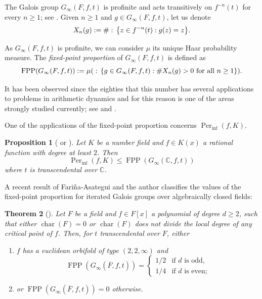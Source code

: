 \documentclass{amsart}
\def\set#1{{\def\st{\;:\;}\left\{#1\right\}}}
\def\CC{\mathbb C}
\DeclareMathOperator{\FPP}{FPP}
\DeclareMathOperator{\Per}{Per}
\DeclareMathOperator{\car}{char}
\DeclareMathOperator{\st}{st}
\newtheorem{proposition}{Proposition}[section]
\newtheorem{theorem}[proposition]{Theorem}
\theoremstyle{definition}
\begin{document}
The Galois group $G_\infty(F,f,t)$ is profinite and acts transitively on $f^{-n}(t)$ for every $n \geq 1$; see \cite{Jones2014, Radi2025FPP}. Given $n \geq 1$ and $g \in G_\infty(F,f,t)$, let us denote $$X_n(g) := \# \set{z \in f^{-n}(t): g(z) = z}.$$

As $G_\infty(F,f,t)$ is profinite, we can consider $\mu$ its unique Haar probability measure. The \textit{fixed-point proportion} of $G_\infty(F,f,t)$ is defined as $$\FPP(G_\infty(F,f,t)) := \mu(\set{g \in G_\infty(F,f,t) : \# X_n(g) > 0 \text{ for all $n \geq 1$}}).$$

It has been observed since the eighties that this number has several applications to problems in arithmetic dynamics \cite{JonesManes2012, ManesThompson2019, Odoni1980, Odoni1985} and for this reason is one of the areas strongly studied currently; see \cite{Adams2025, AdamsHyde2025, Fariña2026, Tucker2013ABC, Jones2008, Jones2012} and \cite[Section 5]{BenedettoManesTucker2019}.

One of the applications of the fixed-point proportion concerns $\Per_{\inf}(f,K)$.

\begin{proposition}[{\cite[Proof of Theorem 6.5]{Juul2014} or \cite[Theorem 3.11]{BridyJones2022}}]
Let $K$ be a number field and $f \in K(x)$ a rational function with degree at least $2$. Then $$\Per_{\inf}(f,K) \leq \FPP(G_\infty(\CC,f,t))$$ where $t$ is transcendental over $\CC$.
\label{proposition: Perinf bounded by FPP}
\end{proposition}

A recent result of Fariña-Asategui and the author classifies the values of the fixed-point proportion for iterated Galois groups over algebraically closed fields:

\begin{theorem}[{\cite[Theorem 2]{FariñaRadi2026FPP}}]
\label{theorem: classification FPP geometric}
Let $F$ be a field and $f\in F[x]$ a polynomial of degree $d \geq 2$, such that either $\car(F)=0$ or $\car(F)$ does not divide the local degree of any critical point of $f$. Then, for $t$ transcendental over $F$, either
\begin{enumerate}[\normalfont(i)]
\item $f$ has a euclidean orbifold of type $(2,2,\infty)$ and $$\FPP(G_\infty(\overline{F}, f, t))=\left \{ \begin{matrix} 
1/2 & \mbox{if $d$ is odd,} \\ 
1/4 & \mbox{if $d$ is even;}
\end{matrix}\right.$$
\item or $\FPP(G_\infty(\overline{F}, f, t))=0$ otherwise.
\end{enumerate}
\end{theorem}
\end{document}
